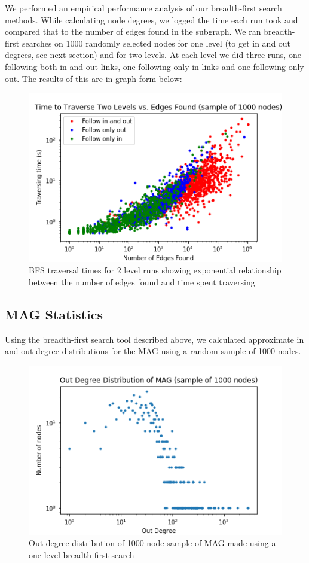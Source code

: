 \documentclass[lettepaper,]{article}
\begin{document}
We performed an empirical performance analysis of our breadth-first
search methods. While calculating node degrees, we logged the time each
run took and compared that to the number of edges found in the subgraph.
We ran breadth-first searches on 1000 randomly selected nodes for one
level (to get in and out degrees, see next section) and for two levels.
At each level we did three runs, one following both in and out links,
one following only in links and one following only out. The results of
this are in graph form below:

\begin{figure}
\centering
\includegraphics{./traveraltimevsedges.png}
\caption{BFS traversal times for 2 level runs showing exponential
relationship between the number of edges found and time spent
traversing}
\end{figure}

\hypertarget{mag-statistics}{%
\subsection{MAG Statistics}\label{mag-statistics}}

Using the breadth-first search tool described above, we calculated
approximate in and out degree distributions for the MAG using a random
sample of 1000 nodes.

\begin{figure}
\centering
\includegraphics{./outdeg.png}
\caption{Out degree distribution of 1000 node sample of MAG made using a
one-level breadth-first search}
\end{figure}
\end{document}
